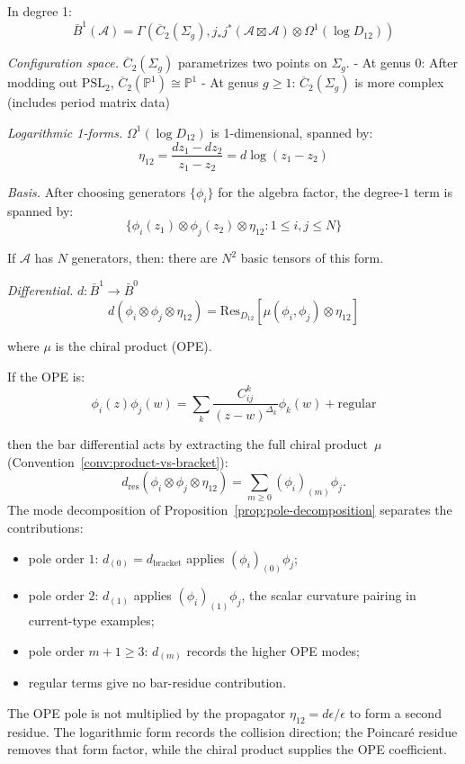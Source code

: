 \begin{computation}\label{comp:deg1-general}
In degree 1:
\[\bar{B}^1(\mathcal{A}) = \Gamma\left(\overline{C}_2(\Sigma_g), j_*j^*(\mathcal{A} \boxtimes \mathcal{A}) \otimes \Omega^1(\log D_{12})\right)\]

\emph{Configuration space.} $\overline{C}_2(\Sigma_g)$ parametrizes two points on $\Sigma_g$.
- At genus 0: After modding out $\text{PSL}_2$, $\overline{C}_2(\mathbb{P}^1) \cong \mathbb{P}^1$
- At genus $g \geq 1$: $\overline{C}_2(\Sigma_g)$ is more complex (includes period matrix data)

\emph{Logarithmic 1-forms.} $\Omega^1(\log D_{12})$ is 1-dimensional, spanned by:
\[\eta_{12} = \frac{dz_1 - dz_2}{z_1 - z_2} = d\log(z_1 - z_2)\]

\emph{Basis.} After choosing generators \(\{\phi_i\}\) for the algebra factor,
the degree-$1$ term is spanned by:
\[\{\phi_i(z_1) \otimes \phi_j(z_2) \otimes \eta_{12} : 1 \le i,j \le N\}\]

If $\mathcal{A}$ has $N$ generators, then:
there are \(N^2\) basic tensors of this form.

\emph{Differential.} $d: \bar{B}^1 \to \bar{B}^0$
\[d(\phi_i \otimes \phi_j \otimes \eta_{12}) = \text{Res}_{D_{12}}[\mu(\phi_i, \phi_j) \otimes \eta_{12}]\]

where $\mu$ is the chiral product (OPE).

If the OPE is:
\[\phi_i(z)\phi_j(w) = \sum_k \frac{C_{ij}^k}{(z-w)^{\Delta_k}} \phi_k(w) + \text{regular}\]

then the bar differential acts by extracting the full chiral
product~$\mu$ (Convention~\ref{conv:product-vs-bracket}):
\[d_{\mathrm{res}}(\phi_i \otimes \phi_j \otimes \eta_{12})
 = \sum_{m \geq 0} (\phi_i)_{(m)}\phi_j.\]
The mode decomposition of Proposition~\ref{prop:pole-decomposition}
separates the contributions:
\begin{itemize}
\item pole order $1$: $d_{(0)}=d_{\mathrm{bracket}}$ applies
 $(\phi_i)_{(0)}\phi_j$;
\item pole order $2$: $d_{(1)}$ applies
 $(\phi_i)_{(1)}\phi_j$, the scalar curvature pairing in
 current-type examples;
\item pole order $m+1\ge3$: $d_{(m)}$ records the higher OPE modes;
\item regular terms give no bar-residue contribution.
\end{itemize}
The OPE pole is not multiplied by the propagator
$\eta_{12}=d\epsilon/\epsilon$ to form a second residue. The
logarithmic form records the collision direction; the Poincar\'e
residue removes that form factor, while the chiral product supplies
the OPE coefficient.
\end{computation}

